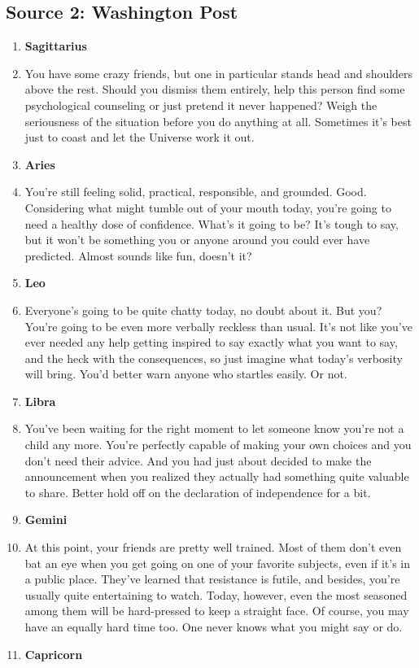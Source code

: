 \documentclass{article}[twocolumn]
\newcommand{\bb}[1]{\item[] \textbf{#1}}
\begin{document}
\begin{multicols}{2}
\section{Source 2: Washington Post
}
\begin{enumerate}
     \bb{Sagittarius}
    \item You have some crazy friends, but one in particular stands head and shoulders above the rest. Should you dismiss them entirely, help this person find some psychological counseling or just pretend it never happened? Weigh the seriousness of the situation before you do anything at all. Sometimes it's best just to coast and let the Universe work it out.
     \bb{Aries}
    \item You're still feeling solid, practical, responsible, and grounded. Good. Considering what might tumble out of your mouth today, you're going to need a healthy dose of confidence. What's it going to be? It's tough to say, but it won't be something you or anyone around you could ever have predicted. Almost sounds like fun, doesn't it?
     \bb{Leo}
    \item Everyone's going to be quite chatty today, no doubt about it. But you? You're going to be even more verbally reckless than usual. It's not like you've ever needed any help getting inspired to say exactly what you want to say, and the heck with the consequences, so just imagine what today's verbosity will bring. You'd better warn anyone who startles easily. Or not.\\
     \bb{Libra}
    \item You've been waiting for the right moment to let someone know you're not a child any more. You're perfectly capable of making your own choices and you don't need their advice. And you had just about decided to make the announcement when you realized they actually had something quite valuable to share. Better hold off on the declaration of independence for a bit.\\
     \bb{Gemini}
    \item At this point, your friends are pretty well trained. Most of them don't even bat an eye when you get going on one of your favorite subjects, even if it's in a public place. They've learned that resistance is futile, and besides, you're usually quite entertaining to watch. Today, however, even the most seasoned among them will be hard-pressed to keep a straight face. Of course, you may have an equally hard time too. One never knows what you might say or do. \\
     \bb{Capricorn}

\end{enumerate}
\end{multicols}
\end{document}
